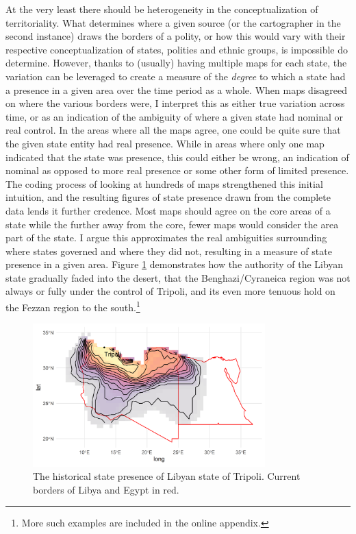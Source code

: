 \documentclass[12pt]{article}
\begin{document}
At the very least there should be heterogeneity in the conceptualization of
territoriality. What determines where a given source (or the cartographer in the
second instance) draws the borders of a polity, or how this would vary with
their respective conceptualization of states, polities and ethnic groups, is
impossible do determine. However, thanks to (usually) having multiple maps for
each state, the variation can be leveraged to create a measure of the
\textit{degree} to which a state had a presence in a given area over the time
period as a whole. When maps disagreed on where the various borders were, I
interpret this as either true variation across time, or as an indication of the
ambiguity of where a given state had nominal or real control. In the areas where
all the maps agree, one could be quite sure that the given state entity had real
presence.  While in areas where only one map indicated that the state was
presence, this could either be wrong, an indication of nominal as opposed to
more real presence or some other form of limited presence. The coding process of
looking at hundreds of maps strengthened this initial intuition, and the
resulting figures of state presence drawn from the complete data lends it
further credence. Most maps should agree on the core areas of a state while the
further away from the core, fewer maps would consider the area part of the
state. I argue this approximates the real ambiguities surrounding where states
governed and where they did not, resulting in a measure of state presence in a
given area. Figure \ref{libya} demonstrates how the authority of the Libyan
state gradually faded into the desert, that the Benghazi/Cyraneica region was
not always or fully under the control of Tripoli, and its even more tenuous hold
on the Fezzan region to the south.\footnote{More such examples are included in
the online appendix.}


\begin{figure}[htpb]
	\centering
	\includegraphics[width=0.8\textwidth,keepaspectratio]{img/libya.png}
	\caption{The historical state presence of Libyan state of Tripoli.
	Current borders of Libya and Egypt in red.}
	\label{libya}
\end{figure}
\end{document}
